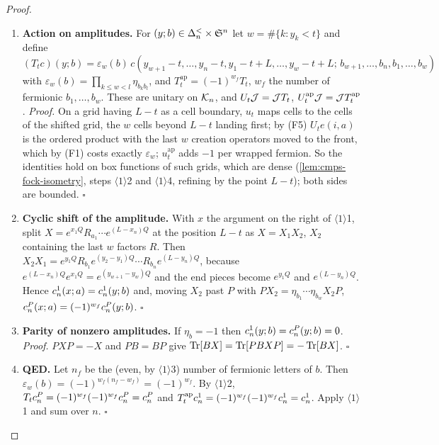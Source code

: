 \begin{proof}
\begin{enumerate}
\item[$\langle1\rangle$1.] \textbf{Action on amplitudes.} For $(y;b)\in\Delta^{<}_{n}\times\mathfrak S^n$ let
$w=\#\{k:y_k<t\}$ and define $(T_tc)(y;b)=\varepsilon_w(b)\,c(y_{w+1}-t,\dots,y_n-t,y_1-t+L,
\dots,y_w-t+L;\,b_{w+1},\dots,b_n,b_1,\dots,b_w)$ with $\varepsilon_w(b)=\prod_{k\le w<l}
\eta_{b_kb_l}$, and $T^{\mathrm{ap}}_t=(-1)^{w_f}T_t$, $w_f$ the number of fermionic
$b_1,\dots,b_w$. These are unitary on $\mathcal K_{n}$, and $U_t\mathcal J=\mathcal J T_t$,
$U^{\mathrm{ap}}_t\mathcal J=\mathcal J T^{\mathrm{ap}}_t$. \emph{Proof.} On a grid having $L-t$ as a cell
boundary, $u_t$ maps cells to the cells of the shifted grid, the $w$ cells beyond $L-t$ landing
first; by (F5) $U_te(i,a)$ is the ordered product with the last $w$ creation operators moved to
the front, which by (F1) costs exactly $\varepsilon_w$; $u^{\mathrm{ap}}_t$ adds $-1$ per wrapped
fermion. So the identities hold on box functions of such grids, which are dense
(\cref{lem:cmps-fock-isometry}, steps $\langle1\rangle$2 and $\langle1\rangle$4, refining by the
point $L-t$); both sides are bounded. $\square$
\item[$\langle1\rangle$2.] \textbf{Cyclic shift of the amplitude.} With $x$ the argument on the
right of $\langle1\rangle$1, split $X=e^{x_1Q}R_{a_1}\cdots e^{(L-x_n)Q}$ at the position $L-t$
as $X=X_1X_2$, $X_2$ containing the last $w$ factors $R$. Then $X_2X_1=e^{y_1Q}R_{b_1}e^{(y_2-y_1)Q}
\cdots R_{b_n}e^{(L-y_n)Q}$, because $e^{(L-x_n)Q}e^{x_1Q}=e^{(y_{w+1}-y_w)Q}$ and the end
pieces become $e^{y_1Q}$ and $e^{(L-y_n)Q}$. Hence $c^{1}_n(x;a)=c^{1}_n(y;b)$ and, moving
$X_2$ past $P$ with $PX_2=\eta_{b_1}\cdots\eta_{b_w}X_2P$, $c^{P}_n(x;a)=(-1)^{w_f}c^{P}_n(y;b)$.
$\square$
\item[$\langle1\rangle$3.] \textbf{Parity of nonzero amplitudes.} If $\eta_b=-1$ then
$c^{1}_n(y;b)=c^{P}_n(y;b)=0$. \emph{Proof.} $PXP=-X$ and $PB=BP$ give $\operatorname{Tr}[BX]=\operatorname{Tr}[PBXP]
=-\operatorname{Tr}[BX]$. $\square$
\item[$\langle1\rangle$4.] \textbf{QED.} Let $n_f$ be the (even, by $\langle1\rangle$3) number of
fermionic letters of $b$. Then $\varepsilon_w(b)=(-1)^{w_f(n_f-w_f)}=(-1)^{w_f}$. By
$\langle1\rangle$2, $T_tc^{P}_n=(-1)^{w_f}(-1)^{w_f}c^{P}_n=c^{P}_n$ and
$T^{\mathrm{ap}}_tc^{1}_n=(-1)^{w_f}(-1)^{w_f}c^{1}_n=c^{1}_n$. Apply $\langle1\rangle$1
and sum over $n$. $\square$
\end{enumerate}
\end{proof}

